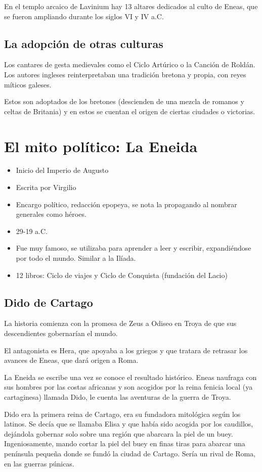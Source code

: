 En el templo arcaico de Lavinium hay 13 altares dedicados al culto de Eneas, que se fueron ampliando durante los siglos VI y IV a.C.

\subsection{La adopción de otras culturas}
Los cantares de gesta medievales como el Ciclo Artúrico o la Canción de Roldán. Los autores ingleses reinterpretaban una tradición bretona y propia, con reyes míticos galeses. 

Estos son adoptados de los bretones (descienden de una mezcla de romanos y celtas de Britania) y en estos se cuentan el origen de ciertas ciudades o victorias.

\section{El mito político: La Eneida}
\begin{itemize}
    \item Inicio del Imperio de Augusto
    \item Escrita por Virgilio
    \item Encargo político, redacción epopeya, se nota la propagando al nombrar generales como héroes.
    \item 29-19 a.C.
    \item Fue muy famoso, se utilizaba para aprender a leer y escribir, expandiéndose por todo el mundo. Similar a la Ilíada.
    \item 12 libros: Ciclo de viajes y Ciclo de Conquista (fundación del Lacio)
\end{itemize}

\subsection{Dido de Cartago}
La historia comienza con la promesa de Zeus a Odiseo en Troya de que sus descendientes gobernarían el mundo.
 
El antagonista es Hera, que apoyaba a los griegos y que tratara de retrasar los avances de Eneas, que dará origen a Roma.

La Eneida se escribe una vez se conoce el resultado histórico. Eneas naufraga con sus hombres por las costas africanas y son acogidos por la reina fenicia local (ya cartaginesa) llamada Dido, le cuenta las aventuras de la guerra de Troya.

Dido era la primera reina de Cartago, era su fundadora mitológica según los latinos. Se decía que se llamaba Elisa y que había sido acogida por los caudillos, dejándola gobernar solo sobre una región que abarcara la piel de un buey. Ingeniosamente, mando cortar la piel del buey en finas tiras para abarcar una península pequeña donde se fundó la ciudad de Cartago. Sería un rival de Roma, en las guerras púnicas.

